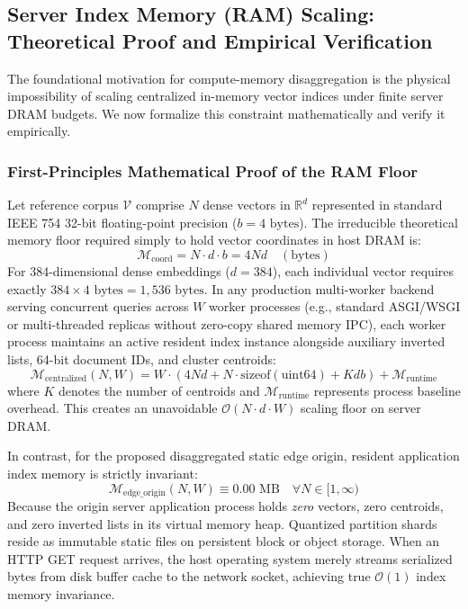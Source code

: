 \documentclass[11pt,journal,compsoc,onecolumn]{IEEEtran}
\begin{document}
\subsection{Server Index Memory (RAM) Scaling: Theoretical Proof and Empirical Verification}
The foundational motivation for compute-memory disaggregation is the physical impossibility of scaling centralized in-memory vector indices under finite server DRAM budgets. We now formalize this constraint mathematically and verify it empirically.

\subsubsection{First-Principles Mathematical Proof of the RAM Floor}
Let reference corpus $\mathcal{V}$ comprise $N$ dense vectors in $\mathbb{R}^d$ represented in standard IEEE 754 32-bit floating-point precision ($b = 4\text{ bytes}$). The irreducible theoretical memory floor required simply to hold vector coordinates in host DRAM is:
\begin{equation}
    \mathcal{M}_{\text{coord}} = N \cdot d \cdot b = 4 N d \quad (\text{bytes})
\end{equation}
For 384-dimensional dense embeddings ($d = 384$), each individual vector requires exactly $384 \times 4\text{ bytes} = 1,536\text{ bytes}$. In any production multi-worker backend serving concurrent queries across $W$ worker processes (e.g., standard ASGI/WSGI or multi-threaded replicas without zero-copy shared memory IPC), each worker process maintains an active resident index instance alongside auxiliary inverted lists, 64-bit document IDs, and cluster centroids:
\begin{equation}
    \mathcal{M}_{\text{centralized}}(N, W) = W \cdot \left( 4 N d + N \cdot \text{sizeof}(\text{uint64}) + K d b \right) + \mathcal{M}_{\text{runtime}}
\end{equation}
where $K$ denotes the number of centroids and $\mathcal{M}_{\text{runtime}}$ represents process baseline overhead. This creates an unavoidable $\mathcal{O}(N \cdot d \cdot W)$ scaling floor on server DRAM.

In contrast, for the proposed disaggregated static edge origin, resident application index memory is strictly invariant:
\begin{equation}
    \mathcal{M}_{\text{edge\_origin}}(N, W) \equiv 0.00\text{ MB} \quad \forall N \in [1, \infty)
\end{equation}
Because the origin server application process holds \textit{zero} vectors, zero centroids, and zero inverted lists in its virtual memory heap. Quantized partition shards reside as immutable static files on persistent block or object storage. When an HTTP GET request arrives, the host operating system merely streams serialized bytes from disk buffer cache to the network socket, achieving true $\mathcal{O}(1)$ index memory invariance.
\end{document}
